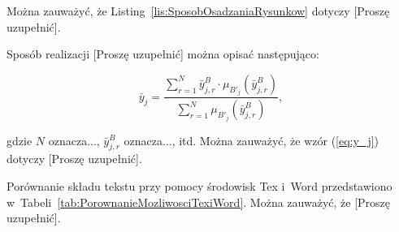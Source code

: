 \documentclass{PracaDyplomowa-Szablon}
\begin{document}
\noindent Można zauważyć, że Listing~\ref{lis:SposobOsadzaniaRysunkow} dotyczy [Proszę uzupełnić].

Sposób realizacji [Proszę uzupełnić] można opisać następująco:

\begin{equation}
\label{eq:y_j}
{{\bar y}_j}=\frac{{\sum\limits_{r=1}^N {\bar y_{j,r}^B\cdot{\mu_{{{B'}_j}}}\left({\bar y_{j,r}^B}\right)}}}{{\sum\limits_{r=1}^N {{\mu_{{{B'}_j}}}\left({\bar y_{j,r}^B}\right)}}},
\end{equation}

\noindent gdzie $N$ oznacza..., ${\bar y_{j,r}^B}$ oznacza..., itd. Można zauważyć, że wzór (\ref{eq:y_j}) dotyczy [Proszę uzupełnić].

Porównanie składu tekstu przy pomocy środowisk Tex i~Word przedstawiono w~Tabeli~\ref{tab:PorownanieMozliwosciTexiWord}. Można zauważyć, że [Proszę uzupełnić].
\end{document}
